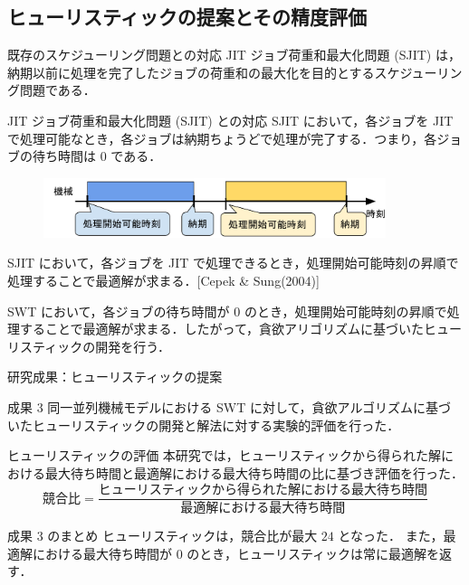 \documentclass[dvipdfmx]{beamer}
\begin{document}
    \subsection{ヒューリスティックの提案とその精度評価}
    \begin{frame}{既存のスケジューリング問題との対応}
      JIT ジョブ荷重和最大化問題 (SJIT) は，納期以前に処理を完了したジョブの荷重和の最大化を目的とするスケジューリング問題である．
      \begin{block}{JIT ジョブ荷重和最大化問題 (SJIT) との対応}
        SJIT において，各ジョブを JIT で処理可能なとき，各ジョブは納期ちょうどで処理が完了する．つまり，各ジョブの待ち時間は $0$ である．
        \vspace{-2mm}
        \begin{figure}[h]
          \centering
          \includegraphics[width=10cm]{figure/SJIT1.pdf}
        \end{figure}
        \vspace{-2mm}
        SJIT において，各ジョブを JIT で処理できるとき，処理開始可能時刻の昇順で処理することで最適解が求まる．[Cepek \& Sung(2004)]
      \end{block}
      \begin{block}{}
        SWT において，各ジョブの待ち時間が $0$ のとき，処理開始可能時刻の昇順で処理することで最適解が求まる．したがって，貪欲アリゴリズムに基づいたヒューリスティックの開発を行う．
      \end{block}
    \end{frame}

    \begin{frame}{研究成果：ヒューリスティックの提案}
      \begin{alertblock}{成果 3}
        同一並列機械モデルにおける SWT に対して，貪欲アルゴリズムに基づいたヒューリスティックの開発と解法に対する実験的評価を行った．
      \end{alertblock}
      \begin{block}{ヒューリスティックの評価}
        本研究では，ヒューリスティックから得られた解における最大待ち時間と最適解における最大待ち時間の比に基づき評価を行った．
        $${\displaystyle \text{競合比} = \frac{\text{ヒューリスティックから得られた解における最大待ち時間}}{\text{最適解における最大待ち時間}}}$$
      \end{block}
      \begin{alertblock}{成果 3 のまとめ}
        ヒューリスティックは，競合比が最大 $24$ となった．
        また，最適解における最大待ち時間が $0$ のとき，ヒューリスティックは常に最適解を返す．
      \end{alertblock}
    \end{frame}
\end{document}
